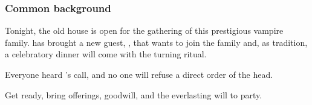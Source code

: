 \subsubsection{Common background}

Tonight, the old house is open for the gathering of this prestigious vampire family.  has brought a new guest, , that wants to join the family and, as tradition, a celebratory dinner will come with the turning ritual.

Everyone heard 's call, and no one will refuse a direct order of the head.

Get ready, bring offerings, goodwill, and the everlasting  will to party.

